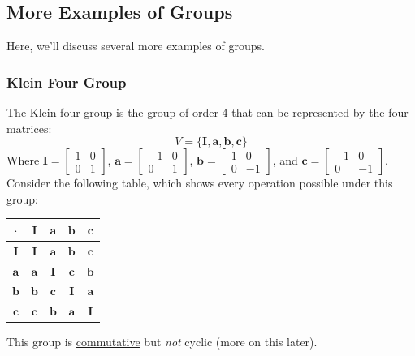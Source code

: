 \documentclass[letterpaper]{article}
\begin{document}
\subsection{More Examples of Groups}
Here, we'll discuss several more examples of groups. 

\subsubsection{Klein Four Group}
The \underline{Klein four group} is the group of order 4 that can be represented by the four matrices: 
\[V = \{\mathbf{I}, \mathbf{a}, \mathbf{b}, \mathbf{c}\}\]
Where $\mathbf{I} = \begin{bmatrix}
    1 & 0 \\ 0 & 1
\end{bmatrix}$, $\mathbf{a} = \begin{bmatrix}
    -1 & 0 \\ 0 & 1
\end{bmatrix}$, $\mathbf{b} = \begin{bmatrix}
    1 & 0 \\ 0 & -1 
\end{bmatrix}$, and $\mathbf{c} = \begin{bmatrix}
    -1 & 0 \\ 0 & -1
\end{bmatrix}$. Consider the following table, which shows every operation possible under this group: 
\begin{center}
    \begin{tabular}{c|c c c c}
        $\cdot$       & $\mathbf{I}$ & $\mathbf{a}$ & $\mathbf{b}$ & $\mathbf{c}$ \\ 
        \hline 
        $\mathbf{I}$  & $\mathbf{I}$ & $\mathbf{a}$ & $\mathbf{b}$ & $\mathbf{c}$ \\ 
        $\mathbf{a}$  & $\mathbf{a}$ & $\mathbf{I}$ & $\mathbf{c}$ & $\mathbf{b}$ \\ 
        $\mathbf{b}$  & $\mathbf{b}$ & $\mathbf{c}$ & $\mathbf{I}$ & $\mathbf{a}$ \\ 
        $\mathbf{c}$  & $\mathbf{c}$ & $\mathbf{b}$ & $\mathbf{a}$ & $\mathbf{I}$
    \end{tabular}
\end{center}
This group is \underline{commutative} but \emph{not} cyclic (more on this later). 
\end{document}
